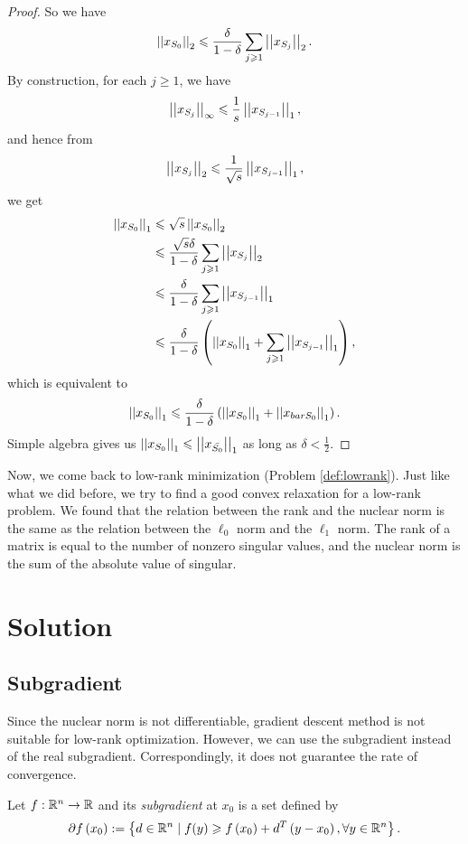 \documentclass[11pt]{article}
\begin{document}
\begin{proof}
So we have
\[\left|\left|x_{S_0}\right|\right|_2\leqslant\frac{\delta}{1-\delta}\sum_{j\geqslant 1}\left|\left|x_{S_j}\right|\right|_2.\]
By construction, for each \(j \geqslant 1\), we have
\[\left|\left|x_{S_j}\right|\right|_\infty\leqslant\frac1s\left|\left|x_{S_{j-1}}\right|\right|_1,\]
and hence from
\[\left|\left|x_{S_j}\right|\right|_2\leqslant\frac{1}{\sqrt s}\left|\left|x_{S_{j-1}}\right|\right|_1,\]
we get
\[\begin{aligned}
    \left|\left|x_{S_0}\right|\right|_1
    &\leqslant \sqrt s\left|\left|x_{S_0}\right|\right|_2\\
    &\leqslant \frac{\sqrt s\delta}{1-\delta}\sum_{j\geqslant 1}\left|\left|x_{S_j}\right|\right|_2\\
    &\leqslant \frac{\delta}{1-\delta}\sum_{j\geqslant 1}\left|\left|x_{S_{j-1}}\right|\right|_1\\
    &\leqslant \frac{\delta}{1-\delta}\left(\left|\left|x_{S_0}\right|\right|_1+\sum_{j\geqslant 1}\left|\left|x_{S_{j-1}}\right|\right|_1\right),
\end{aligned}\]
which is equivalent to
\[\left|\left|x_{S_0}\right|\right|_1\leqslant\frac{\delta}{1-\delta}\left(\left|\left|x_{S_0}\right|\right|_1+\left|\left|x_{bar{S_0}}\right|\right|_1\right).\]
Simple algebra gives us \(\left|\left|x_{S_0}\right|\right|_1\leqslant\left|\left|x_{\bar{S_0}}\right|\right|_1\) as long as \(\delta<\frac{1}{2}\).
\end{proof}

Now, we come back to low-rank minimization (Problem \ref{def:lowrank}). Just like what we did before, we try to find a good convex relaxation for a low-rank problem. 
We found that the relation between the rank and the nuclear norm is the same as the relation between the \(\ell_0\) norm and the \(\ell_1\) norm. The rank of a matrix is equal to the number of nonzero singular values, and the nuclear norm is the sum of the absolute value of singular.

\section{Solution}

\subsection{Subgradient}

Since the nuclear norm is not differentiable, gradient descent method is not suitable for low-rank optimization. However, we can use the subgradient instead of the real subgradient. Correspondingly, it does not guarantee the rate of convergence.

\begin{definition}[Subgradient]
    Let \(f:\mathbb R^n \to \mathbb R\) and its \emph{subgradient} at \(x_0\) is a set defined by
    \[\partial f\left(x_0\right) := \left\{d \in \mathbb R^n \mid f(y)\geqslant f\left(x_0\right) + d^T \left(y-x_0\right),\forall y \in \mathbb R^n\right\}.\]
\end{definition}
\end{document}
